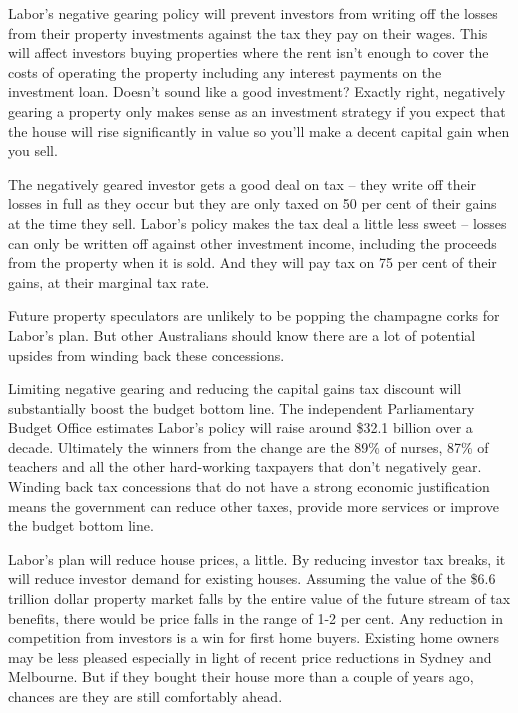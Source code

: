 \documentclass[b5paper,11pt]{article}\usepackage[]{graphicx}\usepackage[]{color}
\begin{document}
Labor's negative gearing policy will prevent investors from writing off
the losses from their property investments against the tax they pay on
their wages. This will affect investors buying properties where the rent
isn't enough to cover the costs of operating the property including any
interest payments on the investment loan. Doesn't sound like a good
investment? Exactly right, negatively gearing a property only makes
sense as an investment strategy if you expect that the house will rise
significantly in value so you'll make a decent capital gain when you
sell.

The negatively geared investor gets a good deal on tax -- they write off
their losses in full as they occur but they are only taxed on 50 per
cent of their gains at the time they sell. Labor's policy makes the tax
deal a little less sweet -- losses can only be written off against other
investment income, including the proceeds from the property when it is
sold. And they will pay tax on 75 per cent of their gains, at their
marginal tax rate.

Future property speculators are unlikely to be popping the champagne
corks for Labor's plan. But other Australians should know there are a
lot of potential upsides from winding back these concessions.

Limiting negative gearing and reducing the capital gains tax discount
will substantially boost the budget bottom line. The independent
Parliamentary Budget Office estimates Labor's policy will raise around
\$32.1 billion over a decade. Ultimately the winners from the change are
the 89\% of nurses, 87\% of teachers and all the other
hard-working taxpayers that don't negatively gear. Winding back tax
concessions that do not have a strong economic justification means the
government can reduce other taxes, provide more services or improve the
budget bottom line.

Labor's plan will reduce house prices, a little. By reducing investor
tax breaks, it will reduce investor demand for existing houses. Assuming
the value of the \$6.6 trillion dollar property market falls by the
entire value of the future stream of tax benefits, there would be price
falls in the range of 1-2 per cent. Any reduction in competition from
investors is a win for first home buyers. Existing home owners may be
less pleased especially in light of recent price reductions in Sydney
and Melbourne. But if they bought their house more than a couple of
years ago, chances are they are still comfortably ahead.
\end{document}
